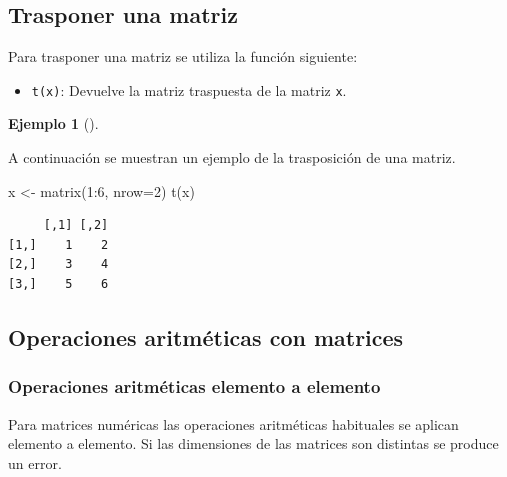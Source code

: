 \documentclass[
  a4paper,
]{scrreport}
\newenvironment{Shaded}{\begin{snugshade}}{\end{snugshade}}
\newcommand{\AttributeTok}[1]{\textcolor[rgb]{0.40,0.45,0.13}{#1}}
\newcommand{\DecValTok}[1]{\textcolor[rgb]{0.68,0.00,0.00}{#1}}
\newcommand{\FunctionTok}[1]{\textcolor[rgb]{0.28,0.35,0.67}{#1}}
\newcommand{\NormalTok}[1]{\textcolor[rgb]{0.00,0.23,0.31}{#1}}
\newcommand{\OtherTok}[1]{\textcolor[rgb]{0.00,0.23,0.31}{#1}}
\newcommand{\SpecialCharTok}[1]{\textcolor[rgb]{0.37,0.37,0.37}{#1}}
\providecommand{\tightlist}{%
  \setlength{\itemsep}{0pt}\setlength{\parskip}{0pt}}\usepackage{longtable,booktabs,array}
\theoremstyle{definition}
\newtheorem{example}{Ejemplo}[chapter]
\theoremstyle{definition}
\theoremstyle{remark}
\begin{document}
\hypertarget{trasponer-una-matriz}{%
\subsection{Trasponer una matriz}\label{trasponer-una-matriz}}

Para trasponer una matriz se utiliza la función siguiente:

\begin{itemize}
\tightlist
\item
  \texttt{t(x)}: Devuelve la matriz traspuesta de la matriz \texttt{x}.
\end{itemize}

\leavevmode{}%
\begin{example}[]\label{exm-trasposicion-matriz}

A continuación se muestran un ejemplo de la trasposición de una matriz.

\begin{Shaded}
\begin{Highlighting}[]
\NormalTok{x }\OtherTok{\textless{}{-}} \FunctionTok{matrix}\NormalTok{(}\DecValTok{1}\SpecialCharTok{:}\DecValTok{6}\NormalTok{, }\AttributeTok{nrow=}\DecValTok{2}\NormalTok{)}
\FunctionTok{t}\NormalTok{(x)}
\end{Highlighting}
\end{Shaded}

\begin{verbatim}
     [,1] [,2]
[1,]    1    2
[2,]    3    4
[3,]    5    6
\end{verbatim}

\end{example}

\hypertarget{operaciones-aritmuxe9ticas-con-matrices}{%
\subsection{Operaciones aritméticas con
matrices}\label{operaciones-aritmuxe9ticas-con-matrices}}

\hypertarget{operaciones-aritmuxe9ticas-elemento-a-elemento-1}{%
\subsubsection{Operaciones aritméticas elemento a
elemento}\label{operaciones-aritmuxe9ticas-elemento-a-elemento-1}}

Para matrices numéricas las operaciones aritméticas habituales se
aplican elemento a elemento. Si las dimensiones de las matrices son
distintas se produce un error.
\end{document}
